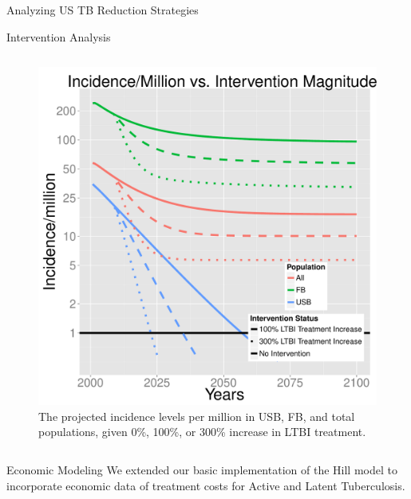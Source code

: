 \documentclass[final]{beamer}
\begin{document}
\begin{frame}
\begin{columns}
\begin{column}{.3\textwidth}
\begin{block}{Analyzing US TB Reduction Strategies}
\begin{block}{Intervention Analysis}
\begin{column}{.45\textwidth}
\begin{figure}[h]
\begin{center}
                \includegraphics[scale=1]{incLTBItrmtIncGrouped}
              \end{center}
              \caption{The projected incidence levels per million in
                       USB, FB, and total populations, given 0\%, 100\%, or
                       300\% increase in LTBI treatment.}
              \label{fig:incLTBItrmt_incidence}
            \end{figure}
          \end{column}
        \end{block}
      \end{block}
      \begin{block}{Economic Modeling}
        We extended our basic implementation of the Hill model to incorporate
        economic data of treatment costs for Active and Latent Tuberculosis.  


\end{block}
\end{column}
\end{columns}
\end{frame}
\end{document}
